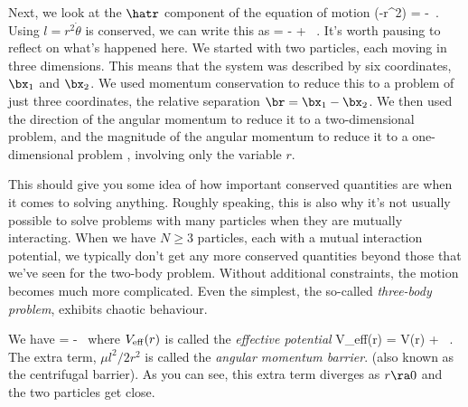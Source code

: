 \para
{\co Next, we look at the $\hatr$ component of the equation of motion
%
\be \mu(-r\dot{\theta}^2) = -\ .\ee
%
Using  $l=r^2\dot{\theta}$ is conserved, we can write this as
%
\be 
\mu{} = - + \ .\label{pinky}\ee
%
}
It's worth pausing to reflect on what's happened here. We started with two particles, each moving in three dimensions. This means that the system was described by six coordinates, $\bx_1$ and $\bx_2$.  We used momentum conservation to reduce this to a problem of just three coordinates, the relative separation $\br=\bx_1-\bx_2$.   We then used the direction of the angular momentum to reduce it to a two-dimensional problem, and the magnitude of the angular momentum to reduce it to a one-dimensional problem , involving only the variable $r$. 



\para
 This should give you some idea of how important conserved quantities are when it comes to solving anything.   Roughly speaking, this is also why it's not usually possible to solve problems with many particles when they are mutually interacting.   When we have $N\geq 3$ particles, each with a mutual interaction potential, we typically don't  get any more conserved quantities beyond those that we've seen for the two-body problem. Without additional constraints, the motion becomes much more complicated. Even the simplest, the so-called {\it three-body problem}, exhibits chaotic behaviour. 
 

\para
{\co We have
%
\be \mu {} = -\ \label{eomeff}\ee
%
where $V_{\rm eff}(r)$ is called the {\it effective potential}
%
\be V_{\rm eff}(r) = V(r) + \ .\label{veff}\ee
%
The extra term, $\mu l^2/2r^2$ is called the {\it angular momentum barrier}}.  (also known as the centrifugal barrier). As you can see, this extra term diverges as  $r\ra 0$ and the two particles get close.



